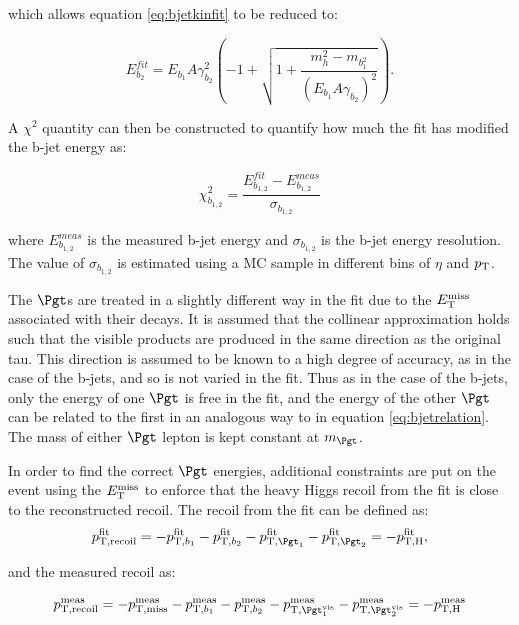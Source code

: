 which allows equation \ref{eq:bjetkinfit} to be reduced to:

\begin{equation}
E_{b_{2}}^{fit} = E_{b_{1}}A\gamma_{b_{2}}^{2}\left(-1 + \sqrt{1 +
\frac{m_{h}^{2} -
m_{b_{1}^{2}}}{\left(E_{b_{1}}A\gamma_{b_{2}}\right)^{2}}}\right) .
\label{eq:bjetrelation}
\end{equation}

A $\chi^{2}$ quantity can then be constructed to quantify how much the fit has
modified the b-jet energy as:

\begin{equation}
\chi_{b_{1,2}}^{2} = \frac{E_{b_{1,2}}^{fit} -
E_{b_{1,2}}^{meas}}{\sigma_{b_{1,2}}}
\end{equation}

where $E_{b_{1,2}}^{meas}$ is the measured b-jet energy and $\sigma_{b_{1,2}}$
is the b-jet energy resolution. The value of $\sigma_{b_{1,2}}$ is estimated
using a \ac{MC} sample in different bins of $\eta$ and $p_{\mathrm{T}}$. 

The $\Pgt$s are treated in a slightly different way in the fit due to the $E_{\mathrm{T}}^{\text{miss}}$
associated with their decays. It is assumed that the collinear approximation
holds such that the visible products are produced in the same direction as the
original tau. This direction is assumed to be known to a high degree of
accuracy, as in the case of the b-jets, and so is not varied in the fit. Thus as
in the case of the b-jets, only the energy of one $\Pgt$ is free in the fit, and
the energy of the other $\Pgt$ can be related to the first in an analogous way
to in equation \ref{eq:bjetrelation}. The mass of either $\Pgt$ lepton is kept
constant at $m_{\Pgt}$.  

In order to find the correct $\Pgt$ energies, additional constraints are put on
the event using the $E_{\mathrm{T}}^{\text{miss}}$ to enforce that the heavy Higgs recoil from the fit
is close to the reconstructed recoil. The recoil from the fit can be defined as:
\begin{equation}
p_{\text{T},\text{recoil}}^{\text{fit}} = - p_{\text{T},b_{1}}^{\text{fit}} -
p_{\text{T},b_{2}}^{\text{fit}} -
p_{\text{T},\Pgt_{1}}^{\text{fit}} - p_{\text{T},\Pgt_{2}}^{\text{fit}} = -
p_{\text{T},\text{H}}^{\text{fit}} ,
\end{equation}

and the measured recoil as:

\begin{equation}
p_{\text{T},\text{recoil}}^{\text{meas}} = - p_{\text{T},\text{miss}}^{\text{meas}} -
p_{\text{T},b_{1}}^{\text{meas}} - p_{\text{T},b_{2}}^{\text{meas}} -
p_{\text{T},\Pgt_{1}^{\text{vis}}}^{\text{meas}} -
p_{\text{T},\Pgt_{2}^{\text{vis}}}^{\text{meas}} = -
p_{\text{T},\text{H}}^{\text{meas}}
\end{equation}

